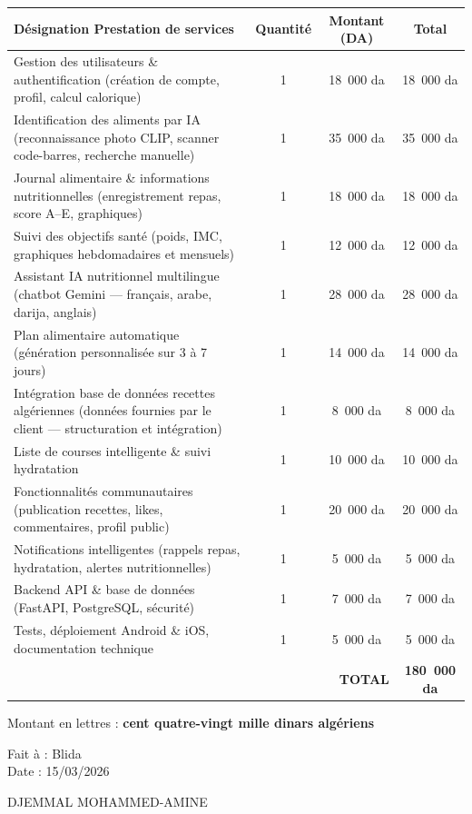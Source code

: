 \documentclass[a4paper,12pt]{article}
\begin{document}
\renewcommand{\arraystretch}{1.6}
\begin{tabularx}{\textwidth}{|X|c|c|c|}
  \hline
  \textbf{Désignation Prestation de services} & \textbf{Quantité} & \textbf{Montant (DA)} & \textbf{Total} \\
  \hline
  Gestion des utilisateurs \& authentification
  (création de compte, profil, calcul calorique)
  & 1 & 18~000 da & 18~000 da \\
  \hline
  Identification des aliments par IA
  (reconnaissance photo CLIP, scanner code-barres, recherche manuelle)
  & 1 & 35~000 da & 35~000 da \\
  \hline
  Journal alimentaire \& informations nutritionnelles
  (enregistrement repas, score A–E, graphiques)
  & 1 & 18~000 da & 18~000 da \\
  \hline
  Suivi des objectifs santé
  (poids, IMC, graphiques hebdomadaires et mensuels)
  & 1 & 12~000 da & 12~000 da \\
  \hline
  Assistant IA nutritionnel multilingue
  (chatbot Gemini — français, arabe, darija, anglais)
  & 1 & 28~000 da & 28~000 da \\
  \hline
  Plan alimentaire automatique
  (génération personnalisée sur 3 à 7 jours)
  & 1 & 14~000 da & 14~000 da \\
  \hline
  Intégration base de données recettes algériennes
  (données fournies par le client — structuration et intégration)
  & 1 & 8~000 da & 8~000 da \\
  \hline
  Liste de courses intelligente \& suivi hydratation
  & 1 & 10~000 da & 10~000 da \\
  \hline
  Fonctionnalités communautaires
  (publication recettes, likes, commentaires, profil public)
  & 1 & 20~000 da & 20~000 da \\
  \hline
  Notifications intelligentes
  (rappels repas, hydratation, alertes nutritionnelles)
  & 1 & 5~000 da & 5~000 da \\
  \hline
  Backend API \& base de données
  (FastAPI, PostgreSQL, sécurité)
  & 1 & 7~000 da & 7~000 da \\
  \hline
  Tests, déploiement Android \& iOS, documentation technique
  & 1 & 5~000 da & 5~000 da \\
  \hline
  \multicolumn{3}{|r|}{\textbf{TOTAL}} & \textbf{180~000 da} \\
  \hline
\end{tabularx}

\vspace{0.6cm}

Montant en lettres : \textbf{cent quatre-vingt mille dinars algériens}

\vspace{1cm}

Fait à : Blida\\
Date : 15/03/2026

\vspace{1.5cm}

\hspace{1cm} DJEMMAL MOHAMMED-AMINE
\end{document}
